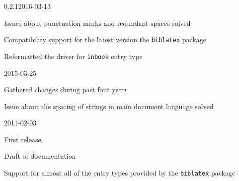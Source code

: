 \documentclass[a4paper,10pt]{ltxdockit}
\def\t|#1|{\texttt{#1}}
\begin{document}
\begin{changelog}

\begin{release}{0.2.1}{2016-03-13}
\item Issues about punctuation marks and redundant spaces solved
\item Compatibility support for the latest version the \t|biblatex| package
\item Reformatted the driver for \verb|inbook| entry type
\end{release}

\begin{release}{0.2}{2015-03-25}
\item Gathered changes during past four years
\item Issue about the spacing of strings in main document language solved
\end{release}

\begin{release}{0.1}{2011-02-03}
\item First release
\item Draft of documentation
\item Support for almost all of the entry types provided by the \t|biblatex| package
\end{release}

\end{changelog}
\end{document}
